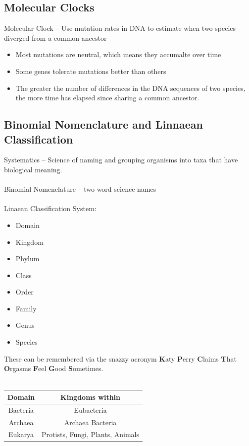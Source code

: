 \documentclass{article}
\begin{document}
\subsection{Molecular Clocks}
Molecular Clock -- Use mutation rates in DNA to estimate when two species diverged from a common ancestor
\begin{itemize}
\item Most mutations are neutral, which means they accumalte over time
\item Some genes tolerate mutations better than others
\item The greater the number of differences in the DNA sequences of two species, the more time has elapsed since sharing a common ancestor.
\end{itemize}

\subsection{Binomial Nomenclature and Linnaean Classification}
Systematics -- Science of naming and grouping organisms into taxa that have biological meaning.\\
\\
Binomial Nomenclature -- two word science names\\
\\
Linaean Classification System:
\begin{itemize}
\item Domain
\item Kingdom
\item Phylum
\item Class
\item Order
\item Family
\item Genus
\item Species
\end{itemize}
These can be remembered via the snazzy acronym \textbf{K}aty \textbf{P}erry \textbf{C}laims \textbf{T}hat \textbf{O}rgasms \textbf{F}eel \textbf{G}ood \textbf{S}ometimes.\\
\\
\begin{tabular}{| c | c |}
\hline
Domain & Kingdoms within\\
\hline
Bacteria & Eubacteria\\
\hline
Archaea & Archaea Bacteria\\
\hline
Eukarya & Protists, Fungi, Plants, Animals\\
\hline

\end{tabular}
\end{document}
